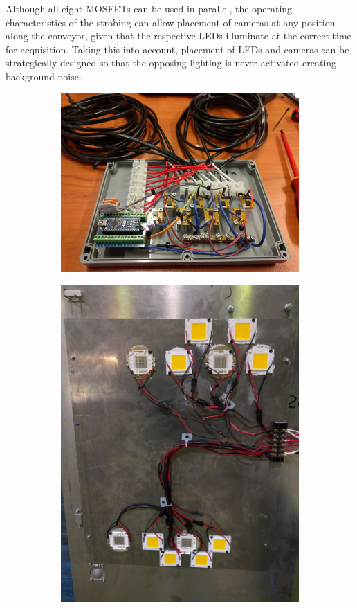 \documentclass[fleqn,twoside,12pt]{report}
\begin{document}
Although all eight MOSFETs can be used in parallel, the operating characteristics of the strobing can allow placement of cameras at any position along the conveyor, given that the respective LEDs illuminate at the correct time for acquisition. Taking this into account, placement of LEDs and cameras can be strategically designed so that the opposing lighting is never activated creating background noise. 


\begin{figure}[h]
	\centering
	\begin{subfigure}{0.4\textwidth}
		\centering
		\includegraphics[width=0.9\linewidth]{mosfet_arduino.jpg}
		\caption{}
		\label{fig:mosfet_arduino}
	\end{subfigure}%
	\begin{subfigure}{0.25\textwidth}
		\centering
		\includegraphics[width=0.8\linewidth]{LED_door_1.jpg}

\end{subfigure}
\end{figure}
\end{document}
